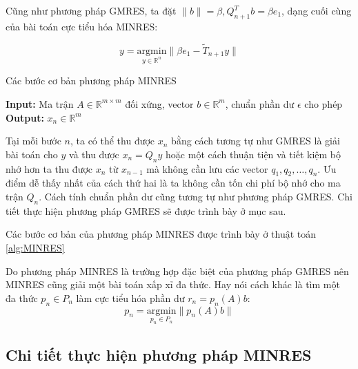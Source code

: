 \documentclass[14pt, a4paper]{article}
\numberwithin{equation}{section}
\numberwithin{algorithm}{section}
\numberwithin{figure}{section}
\numberwithin{dl}{section}
\numberwithin{md}{section}
\numberwithin{bd}{section}
\numberwithin{dn}{section}
\numberwithin{hq}{section}
\begin{document}
Cũng như phương pháp GMRES, ta đặt $\lVert b \rVert= \beta, Q_{n+1}^T b=\beta e_1$, dạng cuối cùng của bài toán cực tiểu hóa MINRES:

\begin{equation}
    y = \underset{y \in \mathbb{R}^n}{\mathrm{argmin}} \lVert \beta e_1 - \widetilde{T}_{n+1} y \rVert 
\end{equation}



\begin{algorithm}[h!]
    \caption{Các bước cơ bản phương pháp MINRES}\label{alg:MINRES}
    \hspace*{\algorithmicindent} \textbf{Input:} {Ma trận $A \in \mathbb{R}^{m \times m}$ đối xứng, vector $b \in \mathbb{R}^m$, chuẩn phần dư $\epsilon$ cho phép} \\
    \hspace*{\algorithmicindent} \textbf{Output:} {$x_n \in \mathbb{R}^m$}
    \begin{algorithmic}
        \EndFor
    \end{algorithmic}
\end{algorithm}

Tại mỗi bước $n$, ta có thể thu được $x_n$ bằng cách tương tự như GMRES là giải bài toán cho $y$ và thu được $x_n = Q_n y$ hoặc một cách thuận tiện và tiết kiệm bộ nhớ hơn ta thu được $x_n$ từ $x_{n-1}$ mà không cần lưu các vector $q_1, q_2, \dots, q_n$. Ưu điểm dễ thấy nhất của cách thứ hai là ta không cần tốn chi phí bộ nhớ cho ma trận $Q_n$.
Cách tính chuẩn phần dư cũng tương tự như phương pháp GMRES. Chi tiết thực hiện phương pháp GMRES sẽ được trình bày ở mục sau.

Các bước cơ bản của phương pháp MINRES được trình bày ở thuật toán \ref{alg:MINRES}

Do phương pháp MINRES là trường hợp đặc biệt của phương pháp GMRES nên MINRES cũng giải một bài toán xấp xỉ đa thức. Hay nói cách khác là tìm một đa thức $p_n \in P_n$ làm cực tiểu hóa phần dư $r_n = p_n(A)b$:
\begin{equation}
    p_n = \underset{p_n \in P_n}{\mathrm{argmin}} \lVert p_n(A)b \rVert
\end{equation}

\subsection{Chi tiết thực hiện phương pháp MINRES} \label{MINRES-Detailed}
\end{document}
